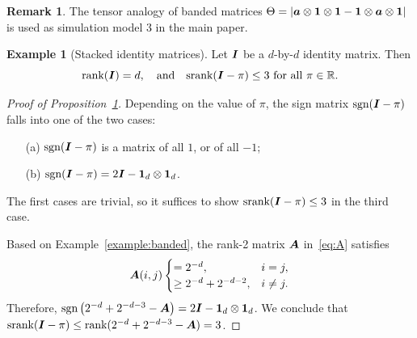 \documentclass[11pt]{article}
\theoremstyle{plain}
\theoremstyle{definition}
\newtheorem{example}{Example}[section]
\newtheorem{rmk}{Remark}[section]
\def\sign{\textup{sgn}}
\def\srank{\textup{srank}}
\def\rank{\textup{rank}}
\begin{document}
\begin{rmk} The tensor analogy of banded matrices $\Theta=|\bm{a}\otimes\mathbf{1}\otimes \mathbf{1}-\mathbf{1}\otimes\bm{a}\otimes \mathbf{1}|$ is used as simulation model 3 in the main paper.  
\end{rmk}

\begin{example}[Stacked identity matrices]\label{ex:identity}
Let $\bm I$ be a $d$-by-$d$ identity matrix. Then
\[
\rank(\mI)=d,\quad\text{and}\quad  \srank(\mI-\pi)\leq 3 \ \text{for all }\pi\in\mathbb{R}.
\]
\end{example}
\begin{proof}[Proof of Proposition~\ref{ex:identity}]
Depending on the value of $\pi$, the sign matrix $\sign(\mI-\pi)$ falls into one of the two cases: 
\begin{enumerate}
\item[(a)] $\sign(\mI-\pi)$ is a matrix of all $1$, or of all $-1$; 
\item[(b)] $\sign(\mI-\pi)=2\mI-\mathbf{1}_d\otimes \mathbf{1}_d$.
\end{enumerate}
The first cases are trivial, so it suffices to show $\srank(\mI-\pi)\leq 3$ in the third case.   


Based on Example~\ref{example:banded}, the rank-2 matrix $\bm A$ in~\eqref{eq:A} satisfies 
\[
\bm A(i,j)
\begin{cases}
=2^{-d}, & i=j,\\
\geq 2^{-d}+2^{-d-2}, & i\neq j.
\end{cases}
\]
Therefore, $\sign\left(2^{-d}+2^{-d-3}-\mA\right)=2\mI-\mathbf{1}_d\otimes \mathbf{1}_d$. We conclude that $\srank(\mI-\pi)\leq \rank(2^{-d}+2^{-d-3}-\mA)=3$. 
\end{proof}
\end{document}
